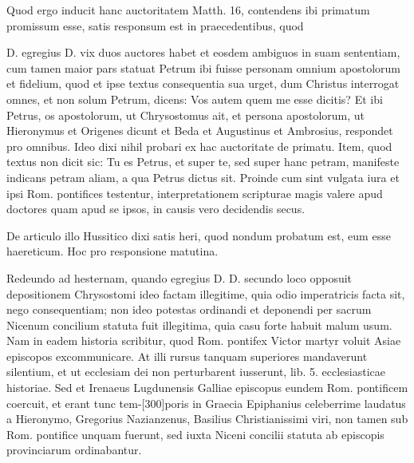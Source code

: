 Quod ergo inducit hanc auctoritatem Matth. 16, contendens ibi primatum promissum esse, satis responsum est in praecedentibus, quod

D. egregius D. vix duos auctores habet et eosdem ambiguos in suam sententiam, cum tamen maior pars statuat Petrum ibi fuisse personam omnium apostolorum et fidelium, quod et ipse textus consequentia sua urget, dum Christus interrogat omnes, et non solum Petrum, dicens: Vos autem quem me esse dicitis? Et ibi Petrus, os apostolorum, ut Chrysostomus ait, et persona apostolorum, ut Hieronymus et Origenes dicunt et Beda et Augustinus et Ambrosius, respondet pro omnibus. Ideo dixi nihil probari ex hac auctoritate de primatu. Item, quod textus non dicit sic: Tu es Petrus, et super te, sed super hanc petram, manifeste indicans petram aliam, a qua Petrus dictus sit. Proinde cum sint vulgata iura et ipsi Rom. pontifices testentur, interpretationem scripturae magis valere apud doctores quam apud se ipsos, in causis vero decidendis secus.

De articulo illo Hussitico dixi satis heri, quod nondum probatum est, eum esse haereticum. Hoc pro responsione matutina.

Redeundo ad hesternam, quando egregius D. D. secundo loco opposuit depositionem Chrysostomi ideo factam illegitime, quia odio imperatricis facta sit, nego consequentiam; non ideo potestas ordinandi et deponendi per sacrum Nicenum concilium statuta fuit illegitima, quia casu forte habuit malum usum. Nam in eadem historia scribitur, quod Rom. pontifex Victor martyr voluit Asiae episcopos excommunicare. At illi rursus tanquam superiores mandaverunt silentium, et ut ecclesiam dei non perturbarent iusserunt, lib. 5. ecclesiasticae historiae. Sed et Irenaeus Lugdunensis Galliae episcopus eundem Rom. pontificem coercuit, et erant tunc tem-[300]poris in Graecia Epiphanius celeberrime laudatus a Hieronymo, Gregorius Nazianzenus, Basilius Christianissimi viri, non tamen sub Rom. pontifice unquam fuerunt, sed iuxta Niceni concilii statuta ab episcopis provinciarum ordinabantur.


